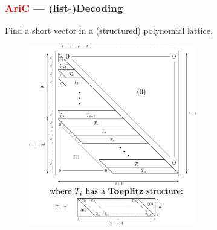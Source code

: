 \documentclass[c]{beamer}
\begin{document}
\begin{frame}
	\frametitle{\textcolor{red}{AriC} --- (list-)Decoding}

	Find a \alert{short vector} in a (structured) \alert{polynomial lattice},
	\begin{figure}
		\centering
		\includegraphics[width=0.65\textwidth]{figures/structured_lattice_matrix.pdf}
	\end{figure}
\end{frame}
%
%
\end{document}
